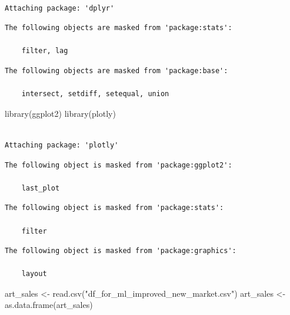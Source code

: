 \documentclass[
  12pt,
]{article}
\newenvironment{Shaded}{\begin{snugshade}}{\end{snugshade}}
\newcommand{\FunctionTok}[1]{\textcolor[rgb]{0.28,0.35,0.67}{#1}}
\newcommand{\NormalTok}[1]{\textcolor[rgb]{0.00,0.23,0.31}{#1}}
\newcommand{\OtherTok}[1]{\textcolor[rgb]{0.00,0.23,0.31}{#1}}
\newcommand{\StringTok}[1]{\textcolor[rgb]{0.13,0.47,0.30}{#1}}
\begin{document}
\begin{verbatim}

Attaching package: 'dplyr'
\end{verbatim}

\begin{verbatim}
The following objects are masked from 'package:stats':

    filter, lag
\end{verbatim}

\begin{verbatim}
The following objects are masked from 'package:base':

    intersect, setdiff, setequal, union
\end{verbatim}

\begin{Shaded}
\begin{Highlighting}[]
\FunctionTok{library}\NormalTok{(ggplot2)}
\FunctionTok{library}\NormalTok{(plotly)}
\end{Highlighting}
\end{Shaded}

\begin{verbatim}

Attaching package: 'plotly'
\end{verbatim}

\begin{verbatim}
The following object is masked from 'package:ggplot2':

    last_plot
\end{verbatim}

\begin{verbatim}
The following object is masked from 'package:stats':

    filter
\end{verbatim}

\begin{verbatim}
The following object is masked from 'package:graphics':

    layout
\end{verbatim}

\begin{Shaded}
\begin{Highlighting}[]
\NormalTok{art\_sales }\OtherTok{\textless{}{-}} \FunctionTok{read.csv}\NormalTok{(}\StringTok{"df\_for\_ml\_improved\_new\_market.csv"}\NormalTok{) }
\NormalTok{art\_sales }\OtherTok{\textless{}{-}} \FunctionTok{as.data.frame}\NormalTok{(art\_sales) }
\end{Highlighting}
\end{Shaded}
\end{document}

